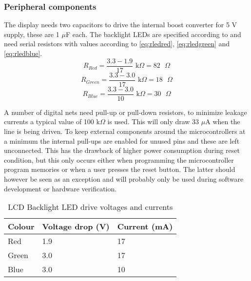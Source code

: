 

\subsubsection{Peripheral components}
The display needs two capacitors to drive the internal boost converter
for 5 V supply, these are 1 $\mu$F each. The backlight LEDs are
specified according to  and need serial
resistors with values according to \ref{eq:rledred}, \ref{eq:rledgreen}
and \ref{eq:rledblue}.
\begin{equation}
R_{Red} = \frac{3.3 - 1.9}{17} \text{ k$\Omega$} = 82 \text{ $\Omega$}
\label{eq:rledred}
\end{equation}
\begin{equation}
R_{Green} = \frac{3.3 - 3.0}{17} \text{ k$\Omega$} = 18 \text{ $\Omega$}
\label{eq:rledgreen}
\end{equation}
\begin{equation}
R_{Blue} = \frac{3.3 - 3.0}{10} \text{ k$\Omega$} = 30 \text{ $\Omega$}
\label{eq:rledblue}
\end{equation}

A number of digital nets need pull-up or pull-down resistors, to
minimize leakage currents a typical value of 100 k$\Omega$ is
used. This will only draw 33 $\mu$A when the line is being driven. To
keep external components around the microcontrollers at a minimum the
internal pull-ups are enabled for unused pins and these are left
unconnected. This has the drawback of higher power consumption during
reset condition, but this only occurs either when programming the
microcontroller program memories or when a user presses the reset
button. The latter should however be seen as an exception and will
probably only be used during software development or hardware
verification.


\begin{table}
\begin{tabular}{|l|l|l|}
\hline
Colour & Voltage drop (V) & Current (mA)\\
\hline
Red & 1.9 & 17\\
Green & 3.0 & 17\\
Blue & 3.0 & 10\\
\hline
\end{tabular}
\caption{LCD Backlight LED drive voltages and currents}
\label{tab:backlightleds}
\end{table}
